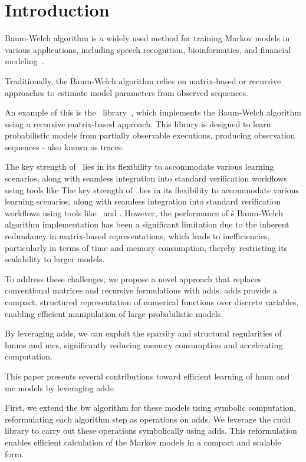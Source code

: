 
\section{Introduction}\label{sec:introduction}
 Baum-Welch algorithm is a widely used method for training Markov models in various applications, including speech recognition, bioinformatics, and financial modeling~\cite{chavan2013overview,ciocchetta2009bio,mamon2007hidden}.

Traditionally, the Baum-Welch algorithm relies on matrix-based or recursive approaches to estimate model parameters from observed sequences.

An example of this is the \Jajapy\ library~\cite{ReynouardIB23}, which implements the Baum-Welch algorithm using a recursive matrix-based approach.
This library is designed to learn probabilistic models from partially observable executions, producing observation sequences - also known as traces.

The key strength of \Jajapy\ lies in its flexibility to accommodate various learning scenarios, along with seamless integration into standard verification workflows using tools like The key strength of \Jajapy\ lies in its flexibility to accommodate various learning scenarios, along with seamless integration into standard verification workflows using tools like \Storm\ and \Prism.
However, the performance of \Jajapy\'s Baum-Welch algorithm implementation has been a significant limitation due to the inherent redundancy in matrix-based representations, which leads to inefficiencies, particularly in terms of time and memory consumption, thereby restricting its scalability to larger models.

To address these challenges, we propose a novel approach that replaces conventional matrices and recursive formulations with \glspl{add}.
\glspl{add} provide a compact, structured representation of numerical functions over discrete variables, enabling efficient manipulation of large probabilistic models.

By leveraging \glspl{add}, we can exploit the sparsity and structural regularities of \glspl{hmm} and \glspl{mc}, significantly reducing memory consumption and accelerating computation.

This paper presents several contributions toward efficient learning of \gls{hmm} and \gls{mc} models by leveraging \glspl{add}:

First, we extend the \gls{bw} algorithm for these models using symbolic computation, reformulating each algorithm step as operations on \glspl{add}.
We leverage the \gls{cudd} library to carry out these operations symbolically using \glspl{add}.
This reformulation enables efficient calculation of the Markov models in a compact and scalable form.

